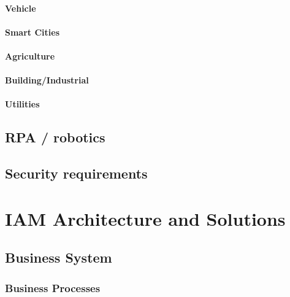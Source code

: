 \hypertarget{vehicle}{%
\subsubsection{Vehicle}\label{vehicle}}

\hypertarget{smart-cities}{%
\subsubsection{Smart Cities}\label{smart-cities}}

\hypertarget{agriculture}{%
\subsubsection{Agriculture}\label{agriculture}}

\hypertarget{buildingindustrial}{%
\subsubsection{Building/Industrial}\label{buildingindustrial}}

\hypertarget{utilities}{%
\subsubsection{Utilities}\label{utilities}}

\hypertarget{rpa-robotics}{%
\section{RPA / robotics}\label{rpa-robotics}}

\hypertarget{security-requirements}{%
\section{Security requirements}\label{security-requirements}}

\hypertarget{iam-architecture-and-solutions}{%
\chapter{IAM Architecture and
Solutions}\label{iam-architecture-and-solutions}}

\hypertarget{business-system}{%
\section{Business System}\label{business-system}}

\hypertarget{business-processes}{%
\subsection{Business Processes}\label{business-processes}}


